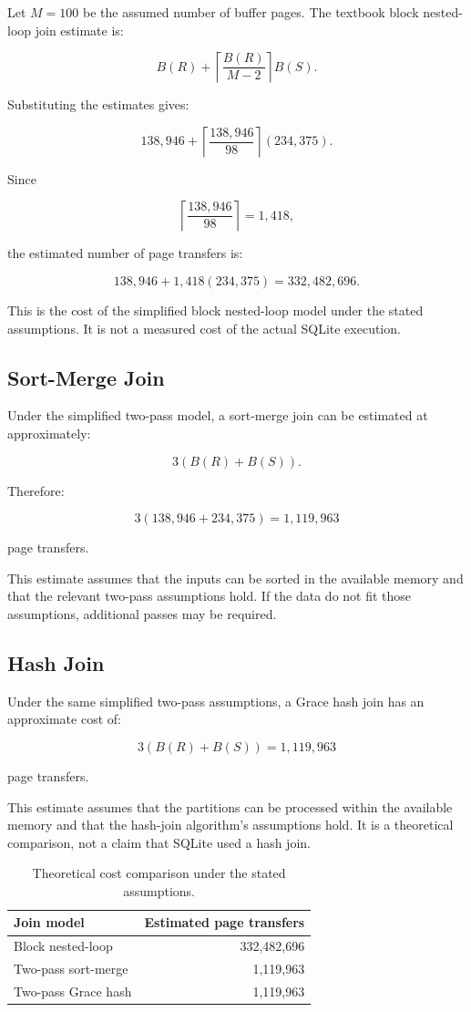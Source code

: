 \documentclass[11pt,a4paper]{article}
\begin{document}
Let \(M=100\) be the assumed number of buffer pages. The textbook
block nested-loop join estimate is:

\[
B(R) +
\left\lceil\frac{B(R)}{M-2}\right\rceil B(S).
\]

Substituting the estimates gives:

\[
138{,}946 +
\left\lceil\frac{138{,}946}{98}\right\rceil
(234{,}375).
\]

Since

\[
\left\lceil\frac{138{,}946}{98}\right\rceil=1{,}418,
\]

the estimated number of page transfers is:

\[
138{,}946 + 1{,}418(234{,}375)
=332{,}482{,}696.
\]

This is the cost of the simplified block nested-loop model under
the stated assumptions. It is not a measured cost of the actual
SQLite execution.

\subsection{Sort-Merge Join}

Under the simplified two-pass model, a sort-merge join can be
estimated at approximately:

\[
3(B(R)+B(S)).
\]

Therefore:

\[
3(138{,}946+234{,}375)
=1{,}119{,}963
\]

page transfers.

This estimate assumes that the inputs can be sorted in the
available memory and that the relevant two-pass assumptions hold.
If the data do not fit those assumptions, additional passes may
be required.

\subsection{Hash Join}

Under the same simplified two-pass assumptions, a Grace hash join
has an approximate cost of:

\[
3(B(R)+B(S))
=1{,}119{,}963
\]

page transfers.

This estimate assumes that the partitions can be processed within
the available memory and that the hash-join algorithm's assumptions
hold. It is a theoretical comparison, not a claim that SQLite used
a hash join.

\begin{table}[H]
\centering
\begin{tabular}{lr}
\toprule
\textbf{Join model} & \textbf{Estimated page transfers} \\
\midrule
Block nested-loop & 332,482,696 \\
Two-pass sort-merge & 1,119,963 \\
Two-pass Grace hash & 1,119,963 \\
\bottomrule
\end{tabular}
\caption{Theoretical cost comparison under the stated assumptions.}
\end{table}
\end{document}
